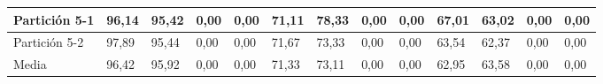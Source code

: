\documentclass[10pt,a4paper]{article}
\begin{document}
\begin{table}[H]
{\begin{tabular}{l|l|l|l|l|l|l|l|l|l|l|l|l|}
\multicolumn{1}{|l|}{Partición 5-1} & 96,14        & 95,42         & 0,00    & 0,00 & 71,11        & 78,33         & 0,00    & 0,00 & 67,01        & 63,02         & 0,00    & 0,00 \\ \hline
\multicolumn{1}{|l|}{Partición 5-2} & 97,89        & 95,44         & 0,00    & 0,00 & 71,67        & 73,33         & 0,00    & 0,00 & 63,54        & 62,37         & 0,00    & 0,00 \\ \hline
\multicolumn{1}{|l|}{Media}         & 96,42        & 95,92         & 0,00    & 0,00 & 71,33        & 73,11         & 0,00    & 0,00 & 62,95        & 63,58         & 0,00    & 0,00 \\ \hline
\end{tabular}}
\end{table}

\end{document}
